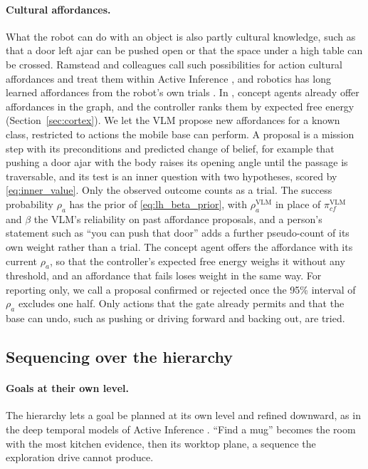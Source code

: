\paragraph{Cultural affordances.}
What the robot can do with an object is also partly cultural knowledge, such as that a door left ajar can be pushed
open or that the space under a high table can be crossed. Ramstead and colleagues call such possibilities for action
cultural affordances and treat them within Active Inference \cite{gibson1979ecological, ramstead2016cultural},
and robotics has long learned affordances from the robot's own trials \cite{sahin2007affordances, jamone2018affordances}. In
\cortex{}, concept agents already offer affordances in the graph, and the controller ranks them by expected free
energy (Section~\ref{sec:cortex}). We let the VLM propose new affordances for a known class, restricted to actions
the mobile base can perform. A proposal is a mission step with its preconditions and predicted change of belief, for
example that pushing a door ajar with the body raises its opening angle until the passage is traversable, and its
test is an inner question with two hypotheses, scored by \eqref{eq:inner_value}. Only the observed outcome counts as a
trial. The success probability $\rho_a$ has the prior of \eqref{eq:lh_beta_prior}, with $\rho^{\text{VLM}}_a$ in
place of $\pi^{\text{VLM}}_{cf}$ and $\beta$ the VLM's reliability on past affordance proposals, and a person's statement such as ``you can push that door'' adds a further
pseudo-count of its own weight rather than a trial. The concept agent offers the affordance with its current
$\rho_a$, so that the controller's expected free energy weighs it without any threshold, and an affordance that fails
loses weight in the same way. For reporting only, we call a proposal confirmed or rejected once the 95\% interval of
$\rho_a$ excludes one half. Only actions that the gate already permits and that the base can undo, such as pushing or
driving forward and backing out, are tried.

\subsection{Sequencing over the hierarchy}
\label{sec:lang_hierarchy:sequencing}

\paragraph{Goals at their own level.}
The hierarchy lets a goal be planned at its own level and refined downward, as in the deep temporal models of Active
Inference \cite{friston2017deeptemporal}. ``Find a mug'' becomes the room with the most kitchen evidence, then its
worktop plane, a sequence the exploration drive cannot produce.

